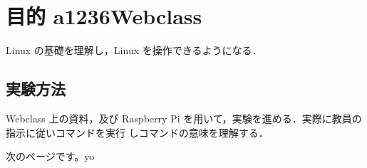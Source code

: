 \documentclass{myreport}  %
\begin{document}
\section[1.]{目的 a1236Webclass}
Linux の基礎を理解し，Linux を操作できるようになる．

\subsection{実験方法}
Webclass 上の資料，及び Raspberry Pi を用いて，実験を進める．実際に教員の指示に従いコマンドを実行
しコマンドの意味を理解する．

\newpage

次のページです。yo
\end{document}
